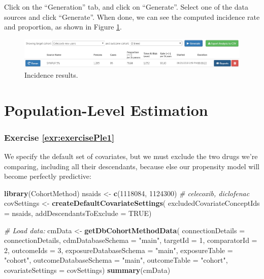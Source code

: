 \documentclass[11pt]{book}
\newenvironment{Shaded}{\begin{snugshade}}{\end{snugshade}}
\newcommand{\KeywordTok}[1]{\textcolor[rgb]{0.13,0.29,0.53}{\textbf{#1}}}
\newcommand{\DataTypeTok}[1]{\textcolor[rgb]{0.13,0.29,0.53}{#1}}
\newcommand{\DecValTok}[1]{\textcolor[rgb]{0.00,0.00,0.81}{#1}}
\newcommand{\StringTok}[1]{\textcolor[rgb]{0.31,0.60,0.02}{#1}}
\newcommand{\CommentTok}[1]{\textcolor[rgb]{0.56,0.35,0.01}{\textit{#1}}}
\newcommand{\OtherTok}[1]{\textcolor[rgb]{0.56,0.35,0.01}{#1}}
\newcommand{\NormalTok}[1]{#1}
\theoremstyle{definition}
\theoremstyle{definition}
\theoremstyle{definition}
\theoremstyle{remark}
\begin{document}
Click on the ``Generation'' tab, and click on ``Generate''. Select one
of the data sources and click ``Generate''. When done, we can see the
computed incidence rate and proportion, as shown in Figure
\ref{fig:irResults}.

\begin{figure}

{\centering \includegraphics[width=1\linewidth]{images/SuggestedAnswers/irResults} 

}

\caption{Incidence results.}\label{fig:irResults}
\end{figure}

\section{Population-Level Estimation}\label{Pleanswers}

\subsubsection*{Exercise
\ref{exr:exercisePle1}}\label{exercise-refexrexerciseple1}

We specify the default set of covariates, but we must exclude the two
drugs we're comparing, including all their descendants, because else our
propensity model will become perfectly predictive:

\begin{Shaded}
\begin{Highlighting}[]
\KeywordTok{library}\NormalTok{(CohortMethod)}
\NormalTok{nsaids <-}\StringTok{ }\KeywordTok{c}\NormalTok{(}\DecValTok{1118084}\NormalTok{, }\DecValTok{1124300}\NormalTok{) }\CommentTok{# celecoxib, diclofenac}
\NormalTok{covSettings <-}\StringTok{ }\KeywordTok{createDefaultCovariateSettings}\NormalTok{(}
  \DataTypeTok{excludedCovariateConceptIds =}\NormalTok{ nsaids,}
  \DataTypeTok{addDescendantsToExclude =} \OtherTok{TRUE}\NormalTok{)}

\CommentTok{# Load data:}
\NormalTok{cmData <-}\StringTok{ }\KeywordTok{getDbCohortMethodData}\NormalTok{(}
  \DataTypeTok{connectionDetails =}\NormalTok{ connectionDetails,}
  \DataTypeTok{cdmDatabaseSchema =} \StringTok{"main"}\NormalTok{,}
  \DataTypeTok{targetId =} \DecValTok{1}\NormalTok{,}
  \DataTypeTok{comparatorId =} \DecValTok{2}\NormalTok{,}
  \DataTypeTok{outcomeIds =} \DecValTok{3}\NormalTok{,}
  \DataTypeTok{exposureDatabaseSchema =} \StringTok{"main"}\NormalTok{,}
  \DataTypeTok{exposureTable =} \StringTok{"cohort"}\NormalTok{,}
  \DataTypeTok{outcomeDatabaseSchema =} \StringTok{"main"}\NormalTok{,}
  \DataTypeTok{outcomeTable =} \StringTok{"cohort"}\NormalTok{,}
  \DataTypeTok{covariateSettings =}\NormalTok{ covSettings)}
\KeywordTok{summary}\NormalTok{(cmData)}
\end{Highlighting}
\end{Shaded}
\end{document}
